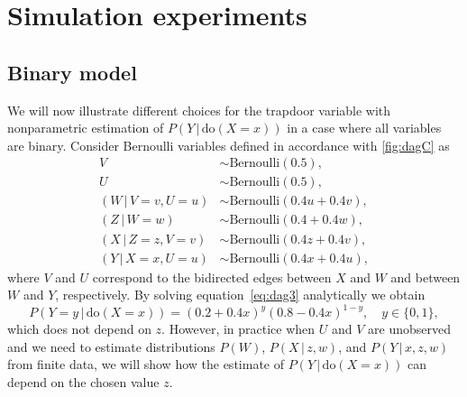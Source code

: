 \documentclass[11pt,a4paper,twoside]{article}
\newcommand{\+}[1]{\ensuremath{\mathbf{#1}}}
\newcommand{\doo}{\textrm{do}}
\newcommand{\given}{{ \, | \, }}
\newcommand{\z}{trapdoor variable}
\begin{document}
\section{Simulation experiments}
\label{sec:simulations}
	
	\subsection{Binary model}
	\label{sec:bernoulli-model}
	
	We will now illustrate different choices for the \z{} with nonparametric estimation of $P(Y \given \doo(X = x))$ in a case where all variables are binary. Consider Bernoulli variables defined in accordance with \autoref{fig:dagC} as
	\begin{equation}
	\label{eq:bernoullidgm}
	\begin{aligned}
	V & \sim \text{Bernoulli}(0.5),\\
	U & \sim \text{Bernoulli}(0.5),\\
	(W \given V = v, U = u) & \sim \text{Bernoulli}(0.4 u + 0.4 v),\\
	(Z \given W = w) & \sim \text{Bernoulli}(0.4 + 0.4 w),\\
	(X \given Z = z, V = v)& \sim \text{Bernoulli}(0.4 z + 0.4 v),\\
	(Y \given X = x, U = u)& \sim \text{Bernoulli}(0.4 x + 0.4 u),
	\end{aligned}
	\end{equation}
	where $V$ and $U$ correspond to the bidirected edges between $X$ and $W$ and between $W$ and $Y$, respectively. By solving equation~\eqref{eq:dag3} analytically we obtain
	\[
	P(Y = y\given \doo(X = x)) = (0.2 + 0.4 x)^y (0.8 - 0.4 x)^{1-y}, \quad y \in \{0,1\},
	\]
	which does not depend on $z$. However, in practice when $U$ and $V$ are unobserved and we need to estimate distributions $P(W)$, $P(X \given  z, w)$, and $P(Y \given  x, z, w)$ from finite data, we will show how the estimate of $P(Y \given \doo(X = x))$ can depend on the chosen value $z$.
	
\end{document}
